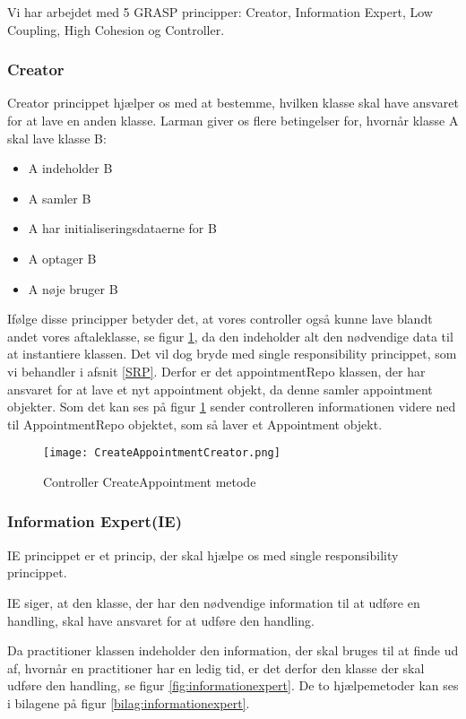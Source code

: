 Vi har arbejdet med 5 GRASP principper: Creator, Information 
Expert, Low Coupling, High Cohesion og Controller.

\subsubsection{Creator}

Creator princippet hjælper os med at bestemme, hvilken klasse skal have ansvaret for at lave en anden klasse.
Larman giver os flere betingelser for, hvornår klasse A skal lave klasse B:\cite{larman}

\begin{itemize}
    \item A indeholder B
    \item A samler B
    \item A har initialiseringsdataerne for B
    \item A optager B
    \item A nøje bruger B
\end{itemize}

Ifølge disse principper betyder det, at vores controller også kunne lave blandt andet vores aftaleklasse, se figur \ref{fig:controllerCreator}, da den indeholder alt den nødvendige data til at instantiere klassen.
Det vil dog bryde med single responsibility princippet, som vi behandler i afsnit \ref{SRP}.
Derfor er det appointmentRepo klassen, der har ansvaret for at lave et nyt appointment objekt, da denne samler appointment objekter.
Som det kan ses på figur \ref{fig:controllerCreator} sender controlleren informationen videre ned til AppointmentRepo objektet, som så laver et Appointment objekt.

\begin{figure}[h]
    \caption{Controller CreateAppointment metode}
    \centering
        \texttt{[image: CreateAppointmentCreator.png]}
    \label{fig:controllerCreator}
\end{figure}

\subsubsection{Information Expert(IE)}
IE princippet er et princip, der skal hjælpe os med single responsibility princippet.

IE siger, at den klasse, der har den nødvendige information til at udføre en handling, skal have ansvaret for at udføre den handling.\cite{solid}

Da practitioner klassen indeholder den information, der skal bruges til at finde ud af, hvornår en practitioner har en ledig tid, er det derfor den klasse der skal udføre den handling, se figur \ref{fig:informationexpert}.
De to hjælpemetoder kan ses i bilagene på figur \ref{bilag:informationexpert}.

